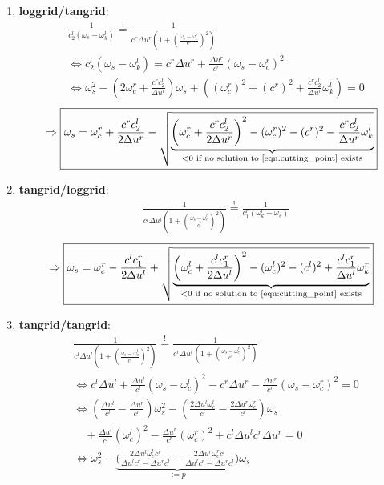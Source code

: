 \begin{enumerate}
	\item {\bf loggrid/tangrid}:
		\begin{align*}
			&\frac{1}{c_2^l(\omega_s-\omega_k^l)}\stackrel{!}{=}\frac{1}{c^r\Delta u^r\left(1+\left(\frac{\omega_s-\omega_c^r}{c^r}\right)^2\right)}\\
			&\Leftrightarrow c_2^l(\omega_s-\omega_k^l) = c^r \Delta u^r + \frac{\Delta u^r}{c^r} (\omega_s-\omega_c^r)^2\\
			&\Leftrightarrow \omega_s^2 - \left(2\omega_c^r + \frac{c^r c_2^l}{\Delta u^r}\right) \omega_s + \left((\omega_c^{r})^2 + (c^r)^2 + \frac{c^r c_2^l}{\Delta u^r} \omega_k^l \right) =0
		\end{align*}
		\[
		 	\Rightarrow \boxed{\omega_s= \omega_c^r + \frac{c^r c_2^l}{2 \Delta u^r} - \sqrt{\underbrace{\left(\omega_c^r + \frac{c^r c_2^l}{2 \Delta u^r}\right)^2 - (\omega_c^{r})^2 - (c^r)^2 - \frac{c^r c_2^l}{\Delta u^r} \omega_k^l }_{<0 \text{ if no solution to \ref{eqn:cutting_point} exists}}}}
		\]
	\item {\bf tangrid/loggrid}:
		\begin{align*}
			&\frac{1}{c^l\Delta u^l\left(1+\left(\frac{\omega_s-\omega_c^l}{c^l}\right)^2\right)}\stackrel{!}{=}\frac{1}{c_1^r(\omega_k^r-\omega_s)}
		\end{align*}
		\[
		 	\Rightarrow \boxed{\omega_s= \omega_c^r - \frac{c^l c_1^r}{2 \Delta u^l} + \sqrt{\underbrace{\left(\omega_c^l + \frac{c^l c_1^r}{2 \Delta u^l}\right)^2 - (\omega_c^{l})^2 - (c^l)^2 + \frac{c^l c_1^r}{\Delta u^l} \omega_k^r }_{<0 \text{ if no solution to \ref{eqn:cutting_point} exists}} }}
		\]
	\item {\bf tangrid/tangrid}:
		\begin{align*}
			&\frac{1}{c^l\Delta u^l\left(1+\left(\frac{\omega_s-\omega_c^l}{c^l}\right)^2\right)}\stackrel{!}{=}\frac{1}{c^r\Delta u^r\left(1+\left(\frac{\omega_s-\omega_c^r}{c^r}\right)^2\right)}\\
			&\Leftrightarrow c^l\Delta u^l + \frac{\Delta u^l}{c^l}(\omega_s - \omega_c^l)^2 - c^r \Delta u^r - \frac{\Delta u^r}{c^r}(\omega_s - \omega_c^r)^2 = 0 \\
			&\Leftrightarrow \left( \frac{\Delta u^l}{c^l} - \frac{\Delta u^r}{c^r}\right) \omega_s^2 - \left( \frac{2\Delta u^l \omega_c^l}{c^l} - \frac{2 \Delta u^r \omega_c^r}{c^r} \right) \omega_s 
			\\
			&\quad + \frac{\Delta u^l}{c^l}(\omega_c^l)^2 - \frac{\Delta u^r}{c^r}(\omega_c^r)^2 + c^l\Delta u^l c^r \Delta u^r = 0\\
			&\Leftrightarrow \omega_s^2 - \underbrace{\biggl(\frac{2\Delta u^l \omega_c^l c^r}{\Delta u^l c^r - \Delta u^r c^l} - \frac{2\Delta u^r \omega_c^r c^l}{\Delta u^l c^r - \Delta u^r c^l} \biggr)}_{:=p} \omega_s \\

\end{align*}
\end{enumerate}
